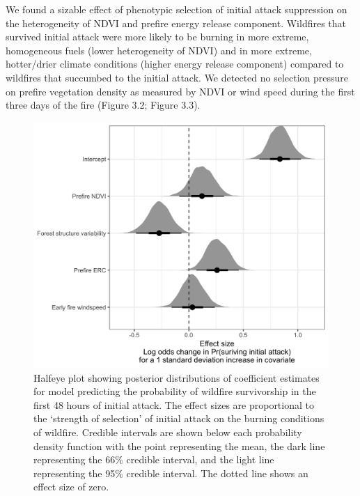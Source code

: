 \documentclass[twoside,12pt,final]{ucthesis-CA2012}
\begin{document}
\begin{ucmainmatter}
We found a sizable effect of phenotypic selection of initial attack
suppression on the heterogeneity of NDVI and prefire energy release
component. Wildfires that survived initial attack were more likely to be
burning in more extreme, homogeneous fuels (lower heterogeneity of NDVI)
and in more extreme, hotter/drier climate conditions (higher energy
release component) compared to wildfires that succumbed to the initial
attack. We detected no selection pressure on prefire vegetation density
as measured by NDVI or wind speed during the first three days of the
fire (Figure 3.2; Figure 3.3).
\begin{figure}
\centering
\includegraphics[width=6.00000in]{figure/chap03/selection-by-suppression-halfeye-simple.png}
\caption{Halfeye plot showing posterior distributions of coefficient
estimates for model predicting the probability of wildfire survivorship
in the first 48 hours of initial attack. The effect sizes are
proportional to the `strength of selection' of initial attack on the
burning conditions of wildfire. Credible intervals are shown below each
probability density function with the point representing the mean, the
dark line representing the 66\% credible interval, and the light line
representing the 95\% credible interval. The dotted line shows an effect
size of zero.}
\end{figure}
\begin{figure}
\centering

\end{figure}
\end{ucmainmatter}
\end{document}
